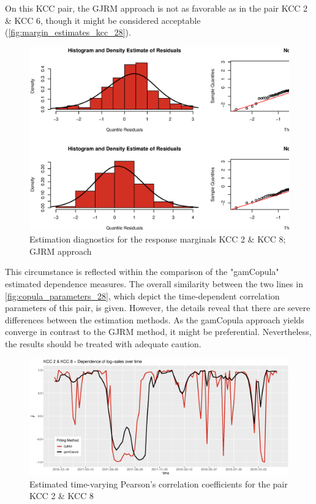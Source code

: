 
On this \ac{KCC} pair, the \ac{GJRM} approach is not as favorable as in the pair KCC 2 \& KCC 6, though it might be considered acceptable (\autoref{fig:margin_estimates_kcc_28}).  \\

\begin{figure}[H]
\centering
  \includegraphics[width=0.9\linewidth]{figures/margin_estimates_kcc_28.eps}
  \caption{Estimation diagnostics for the response marginals KCC 2 \& KCC 8; \ac{GJRM} approach}
  \label{fig:margin_estimates_kcc_28}
\end{figure}

This circumstance is reflected within the comparison of the "gamCopula" estimated dependence measures. The overall similarity between the two lines in \autoref{fig:copula_parameters_28}, which depict the time-dependent correlation parameters of this pair, is given. However, the details reveal that there are severe differences between the estimation methods. As the gamCopula approach yields converge in contrast to the \ac{GJRM} method, it might be preferential. Nevertheless, the results should be treated with adequate caution.

\begin{figure}[H]
\centering
  \includegraphics[width=0.9\linewidth]{figures/copula_parameters_28.eps}
  \caption{Estimated time-varying Pearson's correlation coefficients for the pair KCC 2 \& KCC 8}
  \label{fig:copula_parameters_28}
\end{figure}


